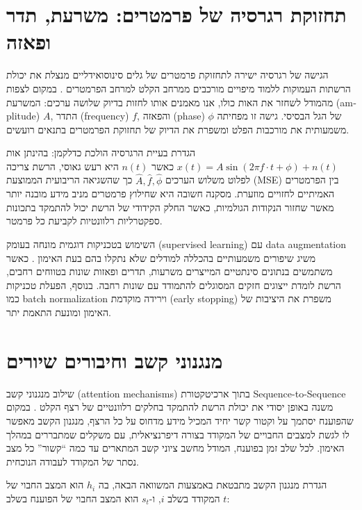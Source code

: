 \section{תחזוקת רגרסיה של פרמטרים: משרעת, תדר ופאזה}

הגישה של רגרסיה ישירה לתחזוקת פרמטרים של גלים סינוסואידליים מנצלת את יכולת הרשתות העמוקות ללמוד מיפויים מורכבים ממרחב הקלט למרחב הפרמטרים \cite{engel2017wavenet}. במקום לצפות מהמודל לשחזר את האות כולו, אנו מאמנים אותו לחזות בדיוק שלושה ערכים: המשרעת (\textenglish{amplitude}) \(A\), התדר (\textenglish{frequency}) \(f\), והפאזה (\textenglish{phase}) \(\phi\) של הגל הבסיסי. גישה זו מפחיתה משמעותית את מורכבות הפלט ומשפרת את הדיוק של תחזוקת הפרמטרים בתנאים רועשים.

הגדרת בעיית הרגרסיה הולכת כדלקמן: בהינתן אות \(x(t) = A\sin(2\pi f \cdot t + \phi) + n(t)\) כאשר \(n(t)\) היא רעש גאוסי, הרשת צריכה לפלוט משלוש הערכים \(\hat{A}, \hat{f}, \hat{\phi}\) כך שהשגיאה הריבועית הממוצעת (\textenglish{MSE}) בין הפרמטרים האמיתיים לחזויים מוזערת. מסקנה חשובה היא שחילוץ פרמטרים מניב מידע מובנה יותר מאשר שחזור הנקודות הגולמיות, כאשר החלק הקידודי של הרשת יכול להתמקד בתכונות ספקטרליות רלוונטיות לקביעת כל פרמטר.

השימוש בטכניקות דוגמית מונחה בעומק (\textenglish{supervised learning}) עם \textenglish{data augmentation} משיג שיפורים משמעותיים בהכללה למודלים שלא נתקלו בהם בעת האימון \cite{luo2019convtasnet}. כאשר משתמשים בנתונים סינתטיים המייצרים משרעות, תדרים ופאזות שונות בטווחים רחבים, הרשת לומדת ייצוגים חזקים המסוגלים להתמודד עם שונות רחבה. בנוסף, הפעלת טכניקות כמו \textenglish{batch normalization} וירידה מוקדמת (\textenglish{early stopping}) משפרת את היציבות של האימון ומונעת התאמת יתר.

\section{מנגנוני קשב וחיבורים שיורים}

שילוב מנגנוני קשב (\textenglish{attention mechanisms}) בתוך ארכיטקטורת \textenglish{Sequence-to-Sequence} משנה באופן יסודי את יכולת הרשת להתמקד בחלקים רלוונטיים של רצף הקלט \cite{valentini2019speech}. במקום שהפוענח יסתמך על וקטור קשר יחיד המכיל מידע מדחוס על כל הרצף, מנגנון הקשב מאפשר לו לגשת למצבים החבויים של המקודד בצורה דיפרנציאלית, עם משקלים שמתבררים במהלך האימון. לכל שלב זמן בפוענח, המודל מחשב ציוני קשב המתארים עד כמה ``קשור'' כל מצב נסתר של המקודד לעבודה הנוכחית.

הגדרת מנגנון הקשב מתבטאת באמצעות המשוואה הבאה, בה \(h_i\) הוא המצב החבוי של המקודד בשלב \(i\), ו-\(s_t\) הוא המצב החבוי של הפוענח בשלב \(t\):

